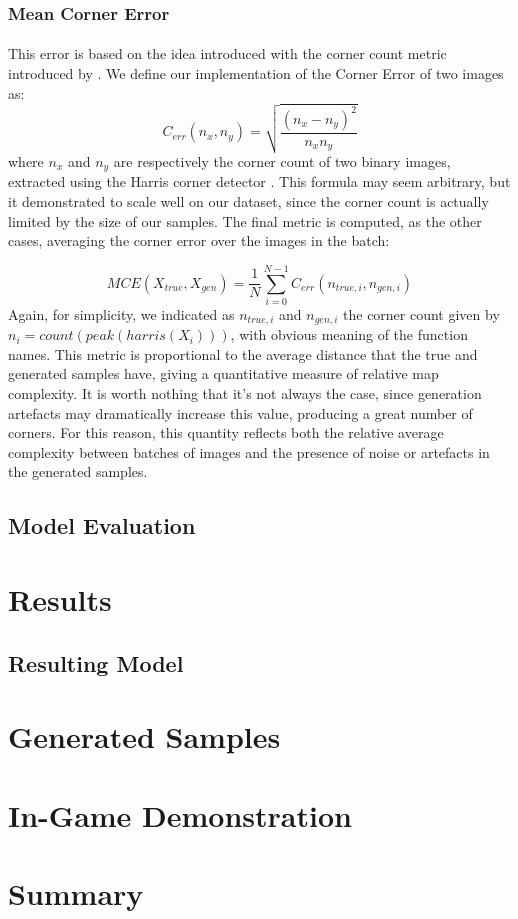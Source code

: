 \subsubsection{Mean Corner Error}
\paragraph{} This error is based on the idea introduced with the corner count metric introduced by \cite{slam}. We define our implementation of the Corner Error of two images as:
\begin{equation}
	C_{err}(n_{x}, n_{y}) = \sqrt{\frac{(n_{x} - n_{y})^2}{n_{x}n_{y}}}
\end{equation}
where $n_{x}$ and $n_{y}$ are respectively the corner count of two binary images, extracted using the Harris corner detector \cite{harrisdetector}.
This formula may seem arbitrary, but it demonstrated to scale well on our dataset, since the corner count is actually limited by the size of our samples. The final metric is computed, as the other cases, averaging the corner error over the images in the batch:

\begin{equation}
MCE(X_{true}, X_{gen}) = \frac{1}{N} \sum_{i=0}^{N-1} C_{err}(n_{true,i}, n_{gen,i})
\end{equation}
Again, for simplicity, we indicated as $ n_{true,i} $ and $ n_{gen,i} $ the corner count given by \\ $ n_{i} = count(peak(harris(X_{i}))) $, with obvious meaning of the function names.
This metric is proportional to the average distance that the true and generated samples have, giving a quantitative measure of relative map complexity. It is worth nothing that it's not always the case, since generation artefacts may dramatically increase this value, producing a great number of corners. For this reason, this quantity reflects both the relative average complexity between batches of images and the presence of noise or artefacts in the generated samples.

\subsection{Model Evaluation}
\label{sec:modelevaluation}


\section{Results}
\label{sec:results}
\subsection{Resulting Model}
\label{sec:sampling}
\section{Generated Samples}
\section{In-Game Demonstration}
\section{Summary}
